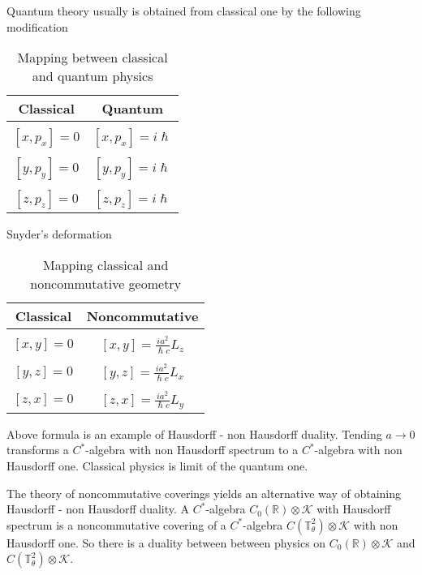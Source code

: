 \documentclass{beamer}
\theoremstyle{plain}
\begin{document}
\begin{frame}
Quantum theory usually is obtained from classical one by the following modification
\break
\begin {table}[H]
\caption {Mapping between classical and quantum physics} \label{main_mapping_table} 
\begin{center}
	\begin{tabular}{|c|c|}
		\hline
		Classical  & Quantum\\
		\hline
		&\\
		$\left[ x, p_x\right] = 0$ & $\left[ x, p_x\right] = i \hslash$ \\
		&\\
		$\left[ y, p_y\right] = 0$ & $\left[ y, p_y\right] = i \hslash$\\
		&\\
$\left[ z, p_z\right] = 0$ & $\left[ z, p_z\right] = i \hslash$\\
		\hline
	\end{tabular}
\end{center}
\end {table}


\end{frame}
\begin{frame}
	Snyder's deformation
	\break
	\begin {table}[H]
	\caption {Mapping classical  and noncommutative geometry} \label{s_mapping_table} 
	\begin{center}
		\begin{tabular}{|c|c|}
			\hline
			Classical  & Noncommutative\\
			\hline
			&\\
			$\left[ x, y\right] = 0$ & $\left[ x, y\right] = \frac{i a^2}{\hslash c}L_z$ \\
			&\\
$\left[ y, z\right] = 0$ & $\left[ y, z\right] = \frac{i a^2}{\hslash c}L_x$ \\
			&\\
$\left[ z, x\right] = 0$ & $\left[ z, x\right] = \frac{i a^2}{\hslash c}L_y$ \\
			\hline
		\end{tabular}
	\end{center}
	\end {table}
Above formula is an example of Hausdorff - non Hausdorff duality. Tending $a \to 0$ transforms a $C^*$-algebra with non Hausdorff spectrum to a $C^*$-algebra with non Hausdorff one. Classical physics is limit of the quantum one.	
\end{frame}
\begin{frame}
	The theory of noncommutative coverings yields an alternative way of obtaining Hausdorff - non Hausdorff duality. A $C^*$-algebra 	$C_0\left( \mathbb R \right) \otimes \mathcal K$  with Hausdorff spectrum is a noncommutative covering of a $C^*$-algebra 	$C\left( \mathbb T^2_\theta \right) \otimes \mathcal K$ with non Hausdorff one. So there is a duality between between physics on
	$C_0\left( \mathbb R \right) \otimes \mathcal K$  and	$C\left( \mathbb T^2_\theta \right) \otimes \mathcal K$.
\end{frame}
\end{document}
